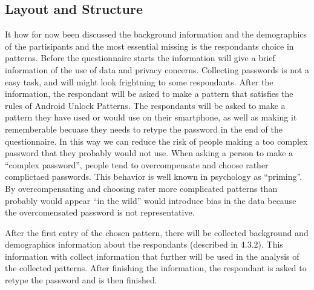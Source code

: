 
       
    \subsection{Layout and Structure}

    It how for now been discussed the background information and the demographics of the partisipants and the most essential missing is the respondants choice in patterns. Before the questionnaire starts the information will give a brief information of the use of data and privacy concerns. Collecting passwords is not a easy task, and will might look frightning to some respondants. After the information, the respondant will be asked to make a pattern that satisfies the rules of Android Unlock Patterns. The respondants will be asked to make a pattern they have used or would use on their smartphone, as well as making it rememberable becuase they needs to retype the password in the end of the questionnaire. In this way we can reduce the risk of people making a too complex password that they probably would not use. When asking a person to make a ``complex password'', people tend to overcompensate and choose rather complictaed passwords. This behavior is well known in psychology as ``priming''. By overcompensating and choosing rater more complicated patterns than probably would appear ``in the wild'' would introduce bias in the data because the overcomensated password is not representative. 

    After the first entry of the chosen pattern, there will be collected background and demographics information about the respondants (described in 4.3.2). This information with collect information that further will be used in the analysis of the collected patterns. After finishing the information, the respondant is asked to retype the password and is then finished. 













